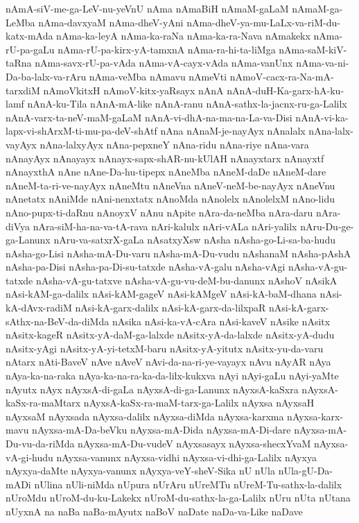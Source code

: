 {nAmA-siV-me-ga-LeV-nu-yeVnU
nAma
nAmaBiH
nAmaM-gaLaM
nAmaM-ga-LeMba
nAma-davxyaM
nAma-dheV-yAni
nAma-dheV-ya-mu-LaLx-va-riM-du-katx-mAda
nAma-ka-leyA
nAma-ka-raNa
nAma-ka-ra-Nava
nAmakekx
nAma-rU-pa-gaLu
nAma-rU-pa-kirx-yA-tamxnA
nAma-ra-hi-ta-liMga
nAma-saM-kiV-taRna
nAma-savx-rU-pa-vAda
nAma-vA-cayx-vAda
nAma-vanUnx
nAma-va-ni-Da-ba-lalx-va-rAru
nAma-veMba
nAmavu
nAmeVti
nAmoV-cacx-ra-Na-mA-tarxdiM
nAmoVkitxH
nAmoV-kitx-yaRsayx
nAnA
nAnA-duH-Ka-garx-hA-ku-lamf
nAnA-ku-Tila
nAnA-mA-like
nAnA-ranu
nAnA-sathx-la-jacnx-ru-ga-Lalilx
nAnA-varx-ta-neV-maM-gaLaM
nAnA-vi-dhA-na-ma-na-La-va-Disi
nAnA-vi-ka-lapx-vi-shArxM-ti-mu-pa-deV-shAtf
nAna
nAnaM-je-nayAyx
nAnalalx
nAna-lalx-vayAyx
nAna-lalxyAyx
nAna-pepxneY
nAna-ridu
nAna-riye
nAna-vara
nAnayAyx
nAnayayx
nAnayx-sapx-shAR-nu-kUlAH
nAnayxtarx
nAnayxtf
nAnayxthA
nAne
nAne-Da-hu-tipepx
nAneMba
nAneM-daDe
nAneM-dare
nAneM-ta-ri-ve-nayAyx
nAneMtu
nAneVna
nAneV-neM-be-nayAyx
nAneVnu
nAnetatx
nAniMde
nAni-nenxtatx
nAnoMda
nAnolelx
nAnolelxM
nAno-lidu
nAno-pupx-ti-daRnu
nAnoyxV
nAnu
nApite
nAra-da-neMba
nAra-daru
nAra-diVya
nAra-siM-ha-na-va-tA-rava
nAri-kalulx
nAri-vALa
nAri-yalilx
nAru-Du-ge-ga-Lanunx
nAru-va-satxrX-gaLa
nAsatxyXsw
nAsha
nAsha-go-Li-sa-ba-hudu
nAsha-go-Lisi
nAsha-mA-Du-varu
nAsha-mA-Du-vudu
nAshanaM
nAsha-pAshA
nAsha-pa-Disi
nAsha-pa-Di-su-tatxde
nAsha-vA-galu
nAsha-vAgi
nAsha-vA-gu-tatxde
nAsha-vA-gu-tatxve
nAsha-vA-gu-vu-deM-bu-danunx
nAshoV
nAsikA
nAsi-kAM-ga-dalilx
nAsi-kAM-gageV
nAsi-kAMgeV
nAsi-kA-baM-dhana
nAsi-kA-dAvx-radiM
nAsi-kA-garx-dalilx
nAsi-kA-garx-da-lilxpaR
nAsi-kA-garx-sAthx-na-BeV-da-diMda
nAsika
nAsi-ka-vA-cAra
nAsi-kaveV
nAsike
nAsitx
nAsitx-kageR
nAsitx-yA-daM-ga-lalxde
nAsitx-yA-da-lalxde
nAsitx-yA-dudu
nAsitx-yAgi
nAsitx-yA-yi-tetxM-baru
nAsitx-yA-yitutx
nAsitx-yu-da-varu
nAtarx
nAti-BaveV
nAve
nAveV
nAvi-da-na-ri-ye-vayayx
nAvu
nAyAR
nAya
nAya-ka-na-raka
nAya-ka-na-ra-ka-da-lilx-kukxva
nAyi
nAyi-gaLu
nAyi-yaMte
nAyutx
nAyx
nAyxsA-di-gaLa
nAyxsA-di-ga-Lanunx
nAyxsA-kaSxra
nAyxsA-kaSx-ra-maMtarx
nAyxsA-kaSx-ra-maM-tarx-ga-Lalilx
nAyxsa
nAyxsaH
nAyxsaM
nAyxsada
nAyxsa-dalilx
nAyxsa-diMda
nAyxsa-karxma
nAyxsa-karx-mavu
nAyxsa-mA-Da-beVku
nAyxsa-mA-Dida
nAyxsa-mA-Di-dare
nAyxsa-mA-Du-vu-da-riMda
nAyxsa-mA-Du-vudeV
nAyxsasayx
nAyxsa-shecxYvaM
nAyxsa-vA-gi-hudu
nAyxsa-vanunx
nAyxsa-vidhi
nAyxsa-vi-dhi-ga-Lalilx
nAyxya
nAyxya-daMte
nAyxya-vanunx
nAyxya-veY-sheV-Sika
nU
nUla
nUla-gU-Da-mADi
nUlina
nUli-niMda
nUpura
nUrAru
nUreMTu
nUreM-Tu-sathx-la-dalilx
nUroMdu
nUroM-du-ku-Lakekx
nUroM-du-sathx-la-ga-Lalilx
nUru
nUta
nUtana
nUyxnA
na
naBa
naBa-mAyutx
naBoV
naDate
naDa-va-Like
naDave
}
